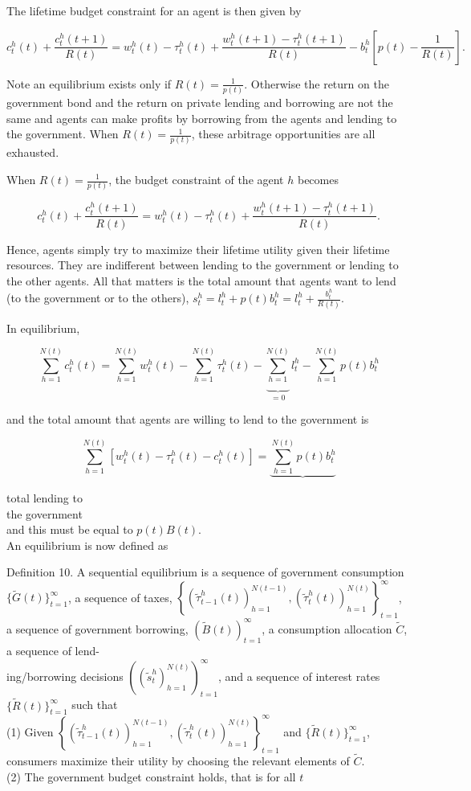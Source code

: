 \documentclass[10pt]{article}
\begin{document}
The lifetime budget constraint for an agent is then given by

$$
c_{t}^{h}(t)+\frac{c_{t}^{h}(t+1)}{R(t)}=w_{t}^{h}(t)-\tau_{t}^{h}(t)+\frac{w_{t}^{h}(t+1)-\tau_{t}^{h}(t+1)}{R(t)}-b_{t}^{h}\left[p(t)-\frac{1}{R(t)}\right] .
$$

Note an equilibrium exists only if $R(t)=\frac{1}{p(t)}$. Otherwise the return on the government bond and the return on private lending and borrowing are not the same and agents can make profits by borrowing from the agents and lending to the government. When $R(t)=\frac{1}{p(t)}$, these arbitrage opportunities are all exhausted.

When $R(t)=\frac{1}{p(t)}$, the budget constraint of the agent $h$ becomes

$$
c_{t}^{h}(t)+\frac{c_{t}^{h}(t+1)}{R(t)}=w_{t}^{h}(t)-\tau_{t}^{h}(t)+\frac{w_{t}^{h}(t+1)-\tau_{t}^{h}(t+1)}{R(t)} .
$$

Hence, agents simply try to maximize their lifetime utility given their lifetime resources. They are indifferent between lending to the government or lending to the other agents. All that matters is the total amount that agents want to lend (to the government or to the others), $s_{t}^{h}=l_{t}^{h}+p(t) b_{t}^{h}=l_{t}^{h}+\frac{b_{t}^{h}}{R(t)}$.

In equilibrium,

$$
\sum_{h=1}^{N(t)} c_{t}^{h}(t)=\sum_{h=1}^{N(t)} w_{t}^{h}(t)-\sum_{h=1}^{N(t)} \tau_{t}^{h}(t)-\underbrace{\sum_{h=1}^{N(t)}}_{=0} l_{t}^{h}-\sum_{h=1}^{N(t)} p(t) b_{t}^{h}
$$

and the total amount that agents are willing to lend to the government is

$$
\sum_{h=1}^{N(t)}\left[w_{t}^{h}(t)-\tau_{t}^{h}(t)-c_{t}^{h}(t)\right]=\underbrace{\sum_{h=1}^{N(t)} p(t) b_{t}^{h}}
$$

total lending to\\
the government\\
and this must be equal to $p(t) B(t)$.\\
An equilibrium is now defined as

Definition 10. A sequential equilibrium is a sequence of government consumption $\{\widetilde{G}(t)\}_{t=1}^{\infty}$, a sequence of taxes, $\left\{\left(\widetilde{\tau}_{t-1}^{h}(t)\right)_{h=1}^{N(t-1)},\left(\widetilde{\tau}_{t}^{h}(t)\right)_{h=1}^{N(t)}\right\}_{t=1}^{\infty}$, a sequence of government borrowing, $(\widetilde{B}(t))_{t=1}^{\infty}$, a consumption allocation $\widetilde{C}$, a sequence of lend-\\
ing/borrowing decisions $\left(\left(\widetilde{s}_{t}^{h}\right)_{h=1}^{N(t)}\right)_{t=1}^{\infty}$, and a sequence of interest rates $\{\widetilde{R}(t)\}_{t=1}^{\infty}$ such that\\
(1) Given $\left\{\left(\widetilde{\tau}_{t-1}^{h}(t)\right)_{h=1}^{N(t-1)},\left(\widetilde{\tau}_{t}^{h}(t)\right)_{h=1}^{N(t)}\right\}_{t=1}^{\infty}$ and $\{\widetilde{R}(t)\}_{t=1}^{\infty}$, consumers maximize their utility by choosing the relevant elements of $\widetilde{C}$.\\
(2) The government budget constraint holds, that is for all $t$
\end{document}
